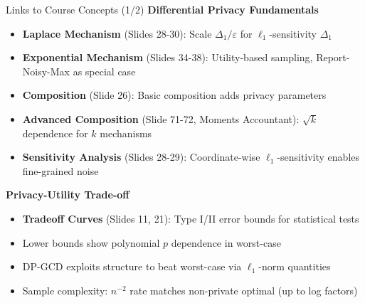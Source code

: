 \documentclass[10pt]{beamer}
\begin{document}
\begin{frame}{Links to Course Concepts (1/2)}
\textbf{Differential Privacy Fundamentals}
\begin{itemize}
\item \textbf{Laplace Mechanism} (Slides 28-30): Scale $\Delta_1/\varepsilon$ for $\ell_1$-sensitivity $\Delta_1$
\item \textbf{Exponential Mechanism} (Slides 34-38): Utility-based sampling, Report-Noisy-Max as special case
\item \textbf{Composition} (Slide 26): Basic composition adds privacy parameters
\item \textbf{Advanced Composition} (Slide 71-72, Moments Accountant): $\sqrt{k}$ dependence for $k$ mechanisms
\item \textbf{Sensitivity Analysis} (Slides 28-29): Coordinate-wise $\ell_1$-sensitivity enables fine-grained noise
\end{itemize}

\vspace{0.5em}
\textbf{Privacy-Utility Trade-off}
\begin{itemize}
\item \textbf{Tradeoff Curves} (Slides 11, 21): Type I/II error bounds for statistical tests
\item Lower bounds show polynomial $p$ dependence in worst-case
\item DP-GCD exploits structure to beat worst-case via $\ell_1$-norm quantities
\item Sample complexity: $n^{-2}$ rate matches non-private optimal (up to log factors)
\end{itemize}
\end{frame}
\end{document}
